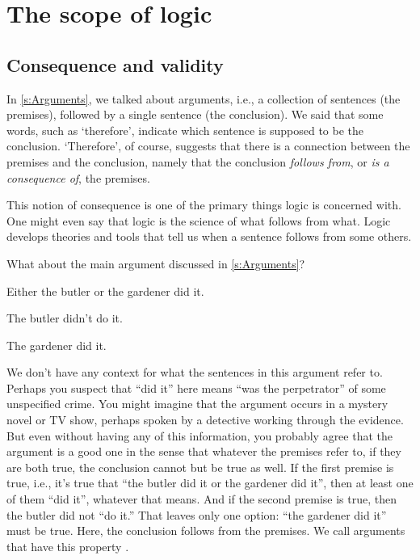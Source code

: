 \chapter{The scope of logic}
\label{s:Valid}

\section{Consequence and validity}

In \cref{s:Arguments}, we talked about arguments, i.e., a collection of sentences (the premises), followed by a single sentence (the conclusion). We said that some words, such as `therefore', indicate which sentence is supposed to be the conclusion. `Therefore', of course, suggests that there is a connection between the premises and the conclusion, namely that the conclusion \emph{follows from}, or \emph{is a consequence of}, the premises.

This notion of consequence is one of the primary things logic is concerned with. One might even say that logic is the science of what follows from what.  Logic develops theories and tools that tell us when a sentence follows from some others.

What about the main argument discussed in \cref{s:Arguments}? 
\begin{earg}
	\item[] Either the butler or the gardener did it.
	\item[] The butler didn't do it.
	\item[\texttherefore] The gardener did it.
\end{earg}
We don't have any context for what the sentences in this argument refer to. Perhaps you suspect that ``did it'' here means ``was the perpetrator'' of some unspecified crime. You might imagine that the argument occurs in a mystery novel or TV show, perhaps spoken by a detective working through the evidence. But even without having any of this information, you probably agree that the argument is a good one in the sense that whatever the premises refer to, if they are both true, the conclusion cannot but be true as well. If the first premise is true, i.e., it's true that ``the butler did it or the gardener did it'', then at least one of them ``did it'', whatever that means. And if the second premise is true, then the butler did not ``do it.'' That leaves only one option: ``the gardener did it'' must be true. Here, the conclusion follows from the premises. We call arguments that have this property .

